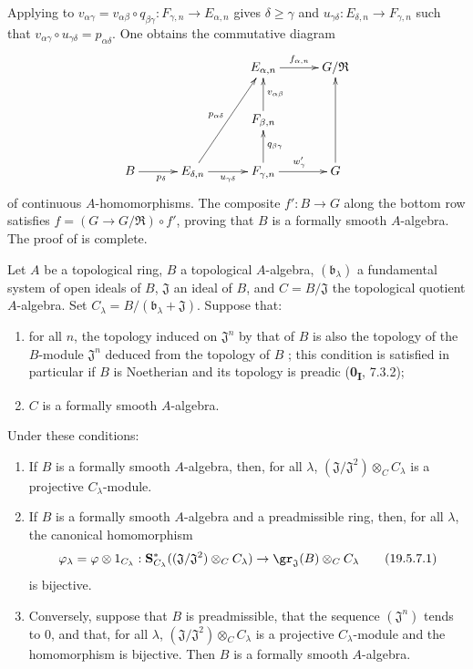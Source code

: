 \begin{env}[19.5.6.8]
Applying  to
$v_{\alpha\gamma}=v_{\alpha\beta}\circ q_{\beta\gamma}:F_{\gamma,n}\to E_{\alpha,n}$
gives $\delta\geq\gamma$ and $u_{\gamma\delta}:E_{\delta,n}\to F_{\gamma,n}$ such that
$v_{\alpha\gamma}\circ u_{\gamma\delta}=p_{\alpha\delta}$.
One obtains the commutative diagram
\[
\xymatrix@C=3em@R=2.5em{
  && E_{\alpha,n} \ar[r]^{f_{\alpha,n}} & G/\mathfrak{R} \\
  && F_{\beta,n} \ar[u]_{v_{\alpha\beta}} & \\
  B \ar[r]_{p_\delta} & E_{\delta,n} \ar[uur]^{p_{\alpha\delta}} \ar[r]_{u_{\gamma\delta}} & F_{\gamma,n} \ar[u]_{q_{\beta\gamma}} \ar[r]^{w'_\gamma} & G \ar[uu]
}
\]
of continuous $A$-homomorphisms.
The composite $f':B\to G$ along the bottom row satisfies $f=(G\to G/\mathfrak{R})\circ f'$, proving that $B$ is a formally smooth $A$-algebra.
The proof of  is complete.
\end{env}

\begin{corollary}[19.5.7]
\label{0.19.5.7}
Let $A$ be a topological ring, $B$ a topological $A$-algebra, $(\mathfrak{b}_\lambda)$ a fundamental system of open ideals of $B$, $\mathfrak{J}$ an ideal of $B$, and $C=B/\mathfrak{J}$ the topological quotient $A$-algebra.
Set $C_\lambda=B/(\mathfrak{b}_\lambda+\mathfrak{J})$.
Suppose that:
\begin{enumerate}
  \item[$1^\circ$] for all $n$, the topology induced on $\mathfrak{J}^n$ by that of $B$ is also the topology of the $B$-module $\mathfrak{J}^n$ deduced from the topology of $B$ ; this condition is satisfied in particular if $B$ is Noetherian and its topology is preadic (\textbf{0\textsubscript{I}}, 7.3.2);
  \item[$2^\circ$] $C$ is a formally smooth $A$-algebra.
\end{enumerate}
Under these conditions:
\begin{enumerate}
  \item[\rm(i)] If $B$ is a formally smooth $A$-algebra, then, for all $\lambda$, $(\mathfrak{J}/\mathfrak{J}^2)\otimes_C C_\lambda$ is a projective $C_\lambda$-module.
  \item[\rm(ii)] If $B$ is a formally smooth $A$-algebra and a preadmissible ring, then, for all $\lambda$, the canonical homomorphism
  \[
    \label{0.19.5.7.1}
    \varphi_\lambda=\varphi\otimes 1_{C_\lambda}:
    \mathbf{S}_{C_\lambda}^*((\mathfrak{J}/\mathfrak{J}^2)\otimes_C C_\lambda)
    \to \gr_\mathfrak{J}(B)\otimes_C C_\lambda
    \tag{19.5.7.1}
  \]
  is bijective.
  \item[\rm(iii)] Conversely, suppose that $B$ is preadmissible, that the sequence $(\mathfrak{J}^n)$ tends to $0$, and that, for all $\lambda$, $(\mathfrak{J}/\mathfrak{J}^2)\otimes_C C_\lambda$ is a projective $C_\lambda$-module and the homomorphism  is bijective.
  Then $B$ is a formally smooth $A$-algebra.
\end{enumerate}
\end{corollary}

